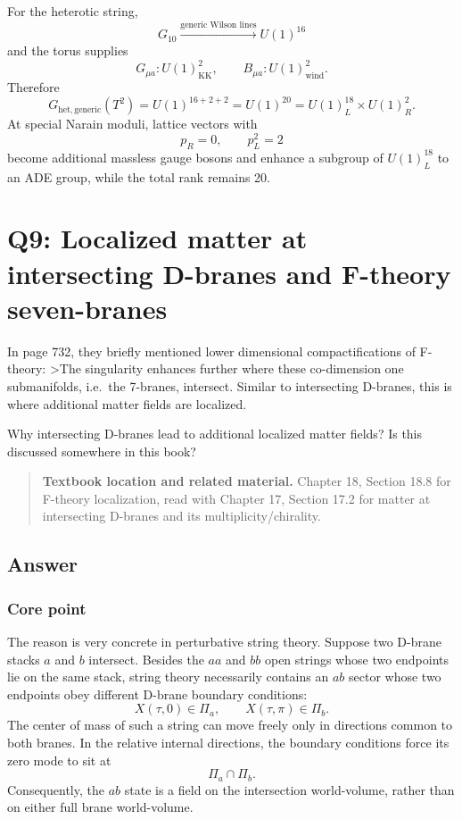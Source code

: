 \documentclass[
  10pt,
  a4paper,
  openany]{book}
\begin{document}
For the heterotic string, \[
\boxed{
G_{10}
\xrightarrow{\text{generic Wilson lines}}
U(1)^{16}
}
\] and the torus supplies \[
\boxed{
G_{\mu a}:U(1)^2_{\mathrm{KK}},
\qquad
B_{\mu a}:U(1)^2_{\mathrm{wind}}
}.
\] Therefore \[
\boxed{
G_{\mathrm{het,generic}}(T^2)
=U(1)^{16+2+2}
=U(1)^{20}
=U(1)^{18}_L\times U(1)^2_R
}.
\] At special Narain moduli, lattice vectors with \[
p_R=0,
\qquad
p_L^2=2
\] become additional massless gauge bosons and enhance a subgroup of
\(U(1)^{18}_L\) to an ADE group, while the total rank remains 20.

\section{Q9: Localized matter at intersecting D-branes and F-theory
seven-branes}\label{q9-localized-matter-at-intersecting-d-branes-and-f-theory-seven-branes}

In page 732, they briefly mentioned lower dimensional compactifications
of F-theory: \textgreater The singularity enhances further where these
co-dimension one submanifolds, i.e.~the 7-branes, intersect. Similar to
intersecting D-branes, this is where additional matter fields are
localized.

Why intersecting D-branes lead to additional localized matter fields? Is
this discussed somewhere in this book?

\begin{quote}
\textbf{Textbook location and related material.} Chapter 18, Section
18.8 for F-theory localization, read with Chapter 17, Section 17.2 for
matter at intersecting D-branes and its multiplicity/chirality.
\end{quote}

\subsection{Answer}\label{answer-44}

\subsubsection{Core point}\label{core-point-44}

The reason is very concrete in perturbative string theory. Suppose two
D-brane stacks \(a\) and \(b\) intersect. Besides the \(aa\) and \(bb\)
open strings whose two endpoints lie on the same stack, string theory
necessarily contains an \(ab\) sector whose two endpoints obey different
D-brane boundary conditions: \[
X(\tau,0)\in\Pi_a,
\qquad
X(\tau,\pi)\in\Pi_b.
\] The center of mass of such a string can move freely only in
directions common to both branes. In the relative internal directions,
the boundary conditions force its zero mode to sit at \[
\Pi_a\cap\Pi_b.
\] Consequently, the \(ab\) state is a field on the intersection
world-volume, rather than on either full brane world-volume.
\end{document}
